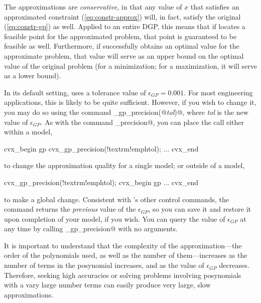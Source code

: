 \documentclass[12pt]{article}
\begin{document}
The approximations are \emph{conservative}, in that any value of $x$ that
satisfies an approximated constraint (\ref{eq:constr-approx})
will, in fact, satisfy the original (\ref{eq:constr-gp}) as well.
Applied to an entire DGP, this means that if \cvx locates a feasible point for
the approximated problem, that point is guaranteed to be feasible as well.
Furthermore, if \cvx successfully obtains an optimal value for the approximate
problem, that value will serve as an upper bound on the optimal value of
the original problem (for a minimization; for a maximization, it will serve
as a lower bound). 

In its default setting, \cvx uses a tolerance value of $\epsilon_{GP}=0.001$.
For most engineering applications, this is likely to be quite sufficient. However,
if you wish to change it, you may do so using the command
\verb@cvx_gp_precision(@\emph{tol}\verb@)@,
where \emph{tol} is the new value of $\epsilon_{GP}$. As with the command
\verb@cvx_precision@, you can place the call either within a model,
\begin{code}[commandchars=\!\{\}]
	cvx_begin gp
	    cvx_gp_precision(!textrm{!emph{tol}});
	    ...
	cvx_end
\end{code}
to change the approximation quality for a single model; or outside of a model,
\begin{code}[commandchars=\!\{\}]
	cvx_gp_precision(!textrm{!emph{tol}});
	cvx_begin gp
	    ...
	cvx_end
\end{code}
to make a global change. Consistent with
\cvx's other control commands, the command returns the \emph{previous}
value of the $\epsilon_{GP}$, so you can save it and restore it upon completion
of your model, if you wish. You can query the value of $\epsilon_{GP}$ at any
time by calling \verb@cvx_gp_precision@ with no arguments. 

It is important to understand that the complexity of the approximation---the order of
the polynomials used, as well as the number of them---increases as the
number of terms in the posynomial increases, and as the value of $\epsilon_{GP}$
decreases. Therefore, seeking high accuracies or solving problems involving 
posynomials with a vary large number terms can easily produce very large, slow
approximations.
\end{document}
